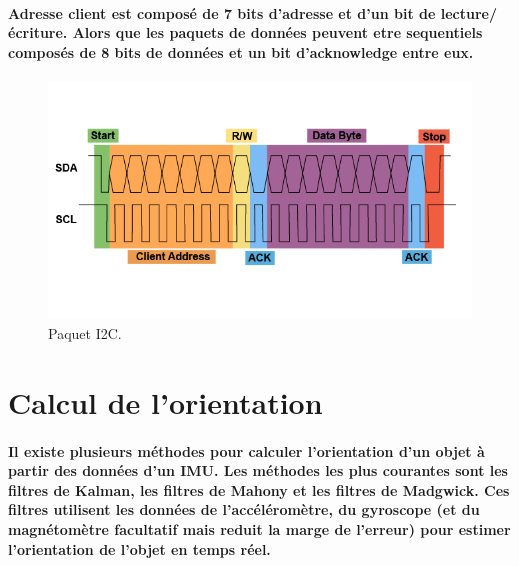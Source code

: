 \paragraph*{\textbf{Adresse client} est composé de 7 bits d'adresse et d'un bit de lecture/écriture. Alors que \textbf{les paquets de données} peuvent etre sequentiels composés de 8 bits de données et un bit d'acknowledge entre eux.}

\begin{figure}[!htpb]
	\centering
	\includegraphics[width=\linewidth]{Figures/i2c-packet.png}
	\caption[Paquet I2C]{Paquet I2C.}
	\label{fig:i2c-packet}
\end{figure}

\section{Calcul de l'orientation}

\paragraph{Il existe plusieurs méthodes pour calculer l'orientation d'un objet à partir des données d'un IMU. Les méthodes les plus courantes sont les filtres de Kalman, les filtres de Mahony et les filtres de Madgwick. Ces filtres utilisent les données de l'accéléromètre, du gyroscope (et du magnétomètre facultatif mais reduit la marge de l'erreur) pour estimer l'orientation de l'objet en temps réel.}


